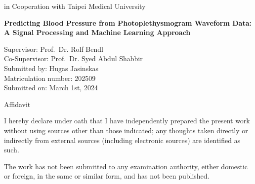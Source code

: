 \documentclass[12pt, bibliography=totoc]{scrartcl}
\begin{document}
\begin{titlepage}
\begin{center}
            \vspace{0.5cm}
            \Large
            in Cooperation with Taipei Medical University

            \hrulefill

            \vspace{1cm}

            \Huge
            \textbf{Predicting Blood Pressure from Photoplethysmogram Waveform Data: A Signal Processing and
            Machine Learning Approach}

        \end{center}

        \vfill
        \Large
        \noindent
        Supervisor: \tab\hspace{-2cm} Prof.\ Dr. Rolf Bendl\\
        Co-Supervisor: \tab\hspace{-2cm} Prof.\ Dr. Syed Abdul Shabbir\\
        Submitted by: \tab\hspace{-2cm} Hugas Jasinskas\\
        Matriculation number: \tab\hspace{-2cm} 202509\\
        Submitted on: \tab\hspace{-2cm} March 1st, 2024\\

    \end{titlepage}

    \newpage

    \begin{Huge}
        \centerline{Affidavit}
    \end{Huge}

    \vspace{2cm}

    \begin{Large}

        I hereby declare under oath that I have independently prepared the present work without using sources other than those indicated; any thoughts taken directly or indirectly from external sources (including electronic sources) are identified as such.

        The work has not been submitted to any examination authority, either domestic or foreign, in the same or similar form, and has not been published.

    \end{Large}

    \vfill
\end{document}
